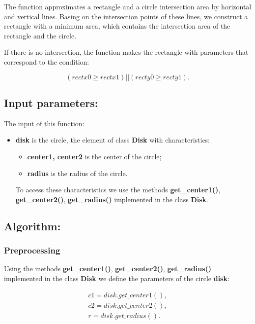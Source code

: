 \documentclass{report}
\begin{document}
The function approximates a rectangle and a circle intersection area by horizontal and vertical lines. Basing on the intersection points of these lines, we construct a rectangle with a minimum area, which contains the intersection area of the rectangle and the circle.

If there is no intersection, the function makes the rectangle with parameters that correspond to the condition: 

\begin{equation}
	(rectx0 \ge rectx1) || (recty0 \ge recty1).
	\label{eq:cond1}
\end{equation}

\subsection*{Input parameters:}

The input of this function:

\begin{itemize}
	\item {\bfseries disk}  is the circle, the element of class {\bfseries Disk} with characteristics:
	\begin{itemize}
		\item {\bfseries center1, center2}  is the center of the circle;
		\item {\bfseries radius}  is  the radius of the circle.
	\end{itemize}
	
	To access these characteristics we use the methods {\bfseries get\_center1()}, {\bfseries get\_center2()}, {\bfseries get\_radius()} implemented in the class {\bfseries Disk}.
\end{itemize}

\subsection*{Algorithm:}

\subsubsection*{Preprocessing}

Using the methods {\bfseries get\_center1()}, {\bfseries get\_center2()}, {\bfseries get\_radius()} implemented in the class {\bfseries Disk} we define the parameters of the circle {\bfseries disk}:

\begin{equation}
	\begin{gathered}
		c1 = disk.get\_center1(),\\
		c2 = disk.get\_center2(),\\
		r = disk.get\_radius().
		\label{eq:paramdisk}
	\end{gathered}
\end{equation}
\end{document}
